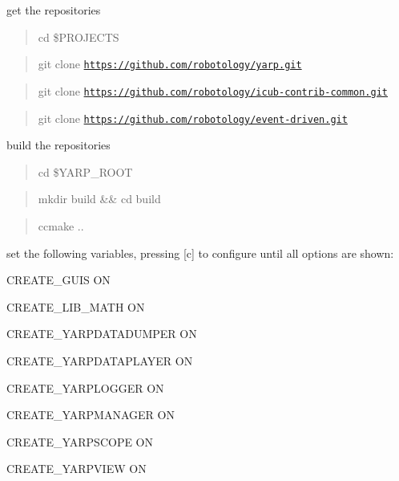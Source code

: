 get the repositories

\begin{quote}
cd \$\+P\+R\+O\+J\+E\+C\+TS \end{quote}


\begin{quote}
git clone \href{https://github.com/robotology/yarp.git}{\tt https\+://github.\+com/robotology/yarp.\+git} \end{quote}


\begin{quote}
git clone \href{https://github.com/robotology/icub-contrib-common.git}{\tt https\+://github.\+com/robotology/icub-\/contrib-\/common.\+git} \end{quote}


\begin{quote}
git clone \href{https://github.com/robotology/event-driven.git}{\tt https\+://github.\+com/robotology/event-\/driven.\+git} \end{quote}


build the repositories

\begin{quote}
cd \$\+Y\+A\+R\+P\+\_\+\+R\+O\+OT \end{quote}


\begin{quote}
mkdir build \&\& cd build \end{quote}


\begin{quote}
ccmake .. \end{quote}


set the following variables, pressing \mbox{[}c\mbox{]} to configure until all options are shown\+:


\begin{DoxyItemize}
\item C\+R\+E\+A\+T\+E\+\_\+\+G\+U\+IS ON
\item C\+R\+E\+A\+T\+E\+\_\+\+L\+I\+B\+\_\+\+M\+A\+TH ON
\item C\+R\+E\+A\+T\+E\+\_\+\+Y\+A\+R\+P\+D\+A\+T\+A\+D\+U\+M\+P\+ER ON
\item C\+R\+E\+A\+T\+E\+\_\+\+Y\+A\+R\+P\+D\+A\+T\+A\+P\+L\+A\+Y\+ER ON
\item C\+R\+E\+A\+T\+E\+\_\+\+Y\+A\+R\+P\+L\+O\+G\+G\+ER ON
\item C\+R\+E\+A\+T\+E\+\_\+\+Y\+A\+R\+P\+M\+A\+N\+A\+G\+ER ON
\item C\+R\+E\+A\+T\+E\+\_\+\+Y\+A\+R\+P\+S\+C\+O\+PE ON
\item C\+R\+E\+A\+T\+E\+\_\+\+Y\+A\+R\+P\+V\+I\+EW ON
\end{DoxyItemize}

